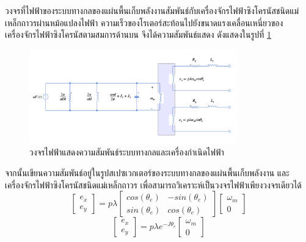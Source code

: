 \documentclass[11pt,a4paper]{article}
\begin{document}
วงจรที่ไฟฟ้าของระบบทางกลของแผ่นพื้นเก็บพลังงานสัมพันธ์กับเครื่องจักรไฟฟ้าซิงโครนัสชนิดแม่เหล็กถาวรผ่านหม้อแปลงไฟฟ้า ความเร็วของโรเตอร์สะท้อนไปยังขนาดแรงเคลื่อนเหนี่ยวของเครื่องจักรไฟฟ้าซิงโครนัสตามสมการด้านบน จึงได้ความสัมพันธ์แสดง ดังแสดงในรูปที่ \ref{mech_cir_elec_cir_ac}
\begin{figure}[H]
    \begin{center}
        \includegraphics[width=0.8\textwidth]{mech_cir_elec_cir_ac.png}
    \end{center}
    \caption{วงจรไฟฟ้าแสดงความสัมพันธ์ระบบทางกลและเครื่องกำเนิดไฟฟ้า}
    \label{mech_cir_elec_cir_ac}
\end{figure}

จากนั้นเขียนความสัมพันธ์อยู่ในรูปสเปซเวกเตอร์ของระบบทางกลของแผ่นพื้นเก็บพลังงาน และเครื่องจักรไฟฟ้าซิงโครนัสชนิดแม่เหล็กถาวร เพื่อสามารถวิเคราะห์เป็นวงจรไฟฟ้าเพียงวงจรเดียวได้
\begin{equation}
    \begin{bmatrix}
        e_{x} \\ e_{y}
    \end{bmatrix} = p\lambda
    \begin{bmatrix}
        cos(\theta_{e}) & -sin(\theta_{e}) \\ sin(\theta_{e}) & cos(\theta_{e})
    \end{bmatrix}
    \begin{bmatrix}
        \omega_{m} \\ 0
    \end{bmatrix}
\end{equation}
\begin{equation}
    \begin{bmatrix}
        e_{x} \\ e_{y}
    \end{bmatrix} = p\lambda e^{-J \theta_{e} }
    \begin{bmatrix}
        \omega_{m} \\ 0
    \end{bmatrix}
\end{equation}
\end{document}
